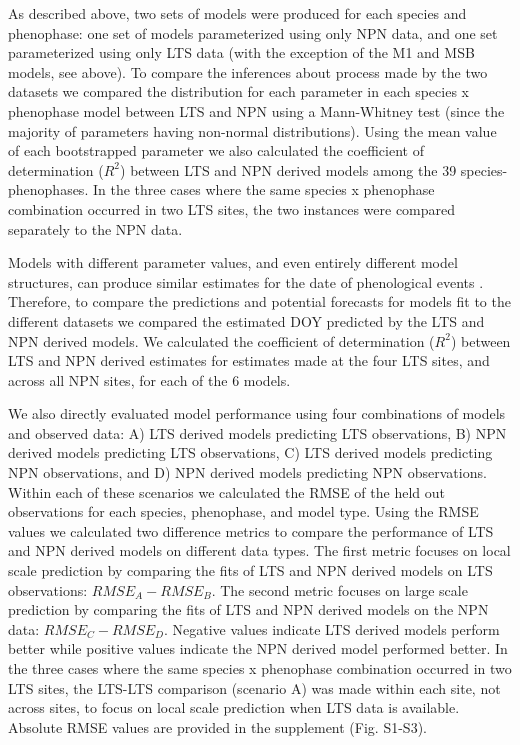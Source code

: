 \documentclass[fleqn,10pt,lineno]{wlpeerj} %
\begin{document}
As described above, two sets of models were produced for each species and phenophase: one set of models parameterized using only NPN data, and one set parameterized using only LTS data (with the exception of the M1 and MSB models, see above). To compare the inferences about process made by the two datasets we compared the distribution for each parameter in each species x phenophase model between LTS and NPN using a Mann-Whitney test (since the majority of parameters having non-normal distributions). Using the mean value of each bootstrapped parameter we also calculated the coefficient of determination ($R^2$) between LTS and NPN derived models among the 39 species-phenophases. In the three cases where the same species x phenophase combination occurred in two LTS sites, the two instances were compared separately to the NPN data.

Models with different parameter values, and even entirely different model structures, can produce similar estimates for the date of phenological events \citep{basler2016}. Therefore, to compare the predictions and potential forecasts for models fit to the different datasets we compared the estimated DOY predicted by the LTS and NPN derived models. We calculated the coefficient of determination ($R^2$) between LTS and NPN derived estimates for estimates made at the four LTS sites, and across all NPN sites, for each of the 6 models.   

We also directly evaluated model performance using four combinations of models and observed data: A) LTS derived models predicting LTS observations, B) NPN derived models predicting LTS observations, C) LTS derived models predicting NPN observations, and D) NPN derived models predicting NPN observations. Within each of these scenarios we calculated the RMSE of the held out observations for each species, phenophase, and model type. Using the RMSE values we calculated two difference metrics to compare the performance of LTS and NPN derived models on different data types. The first metric focuses on local scale prediction by comparing the fits of LTS and NPN derived models on LTS observations: $RMSE_{A} - RMSE_{B}$. The second metric focuses on large scale prediction by comparing the fits of LTS and NPN derived models on the NPN data: $RMSE_{C} - RMSE_{D}$. Negative values indicate LTS derived models perform better while positive values indicate the NPN derived model performed better. In the three cases where the same species x phenophase combination occurred in two LTS sites, the LTS-LTS comparison (scenario A) was made within each site, not across sites, to focus on local scale prediction when LTS data is available. Absolute RMSE values are provided in the supplement (Fig. S1-S3).
\end{document}

